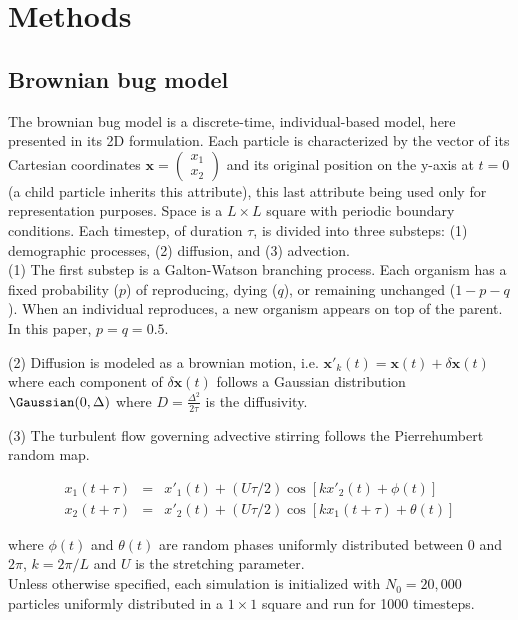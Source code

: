 \section*{Methods}

\subsection*{Brownian bug model}
The brownian bug model is a discrete-time, individual-based model, here presented in its 2D formulation. Each particle is characterized by the vector of its Cartesian coordinates $\boldsymbol{x}=\begin{pmatrix} 
      x_1\\ 
      x_2 
\end{pmatrix}$ and its original position on the y-axis at $t=0$ (a child particle inherits this attribute), this last attribute being used only for representation purposes. Space is a $L\times L$ square with periodic boundary conditions. Each timestep, of duration $\tau$, is divided into three substeps: (1) demographic processes, (2) diffusion, and (3) advection. \\

(1) The first substep is a Galton-Watson branching process. Each organism has a fixed probability ($p$) of reproducing, dying ($q$), or remaining unchanged ($1-p-q$). When an individual reproduces, a new organism appears on top of the parent. In this paper, $p=q=0.5$.

(2) Diffusion is modeled as a brownian motion, i.e. $\boldsymbol{x'}_k(t)=\boldsymbol{x}(t)+\delta\boldsymbol{x}(t)$ where each component of $\delta\boldsymbol{x}(t)$ follows a Gaussian distribution $\Gaussian (0,\Delta)$ where $D=\frac{\Delta^2}{2\tau}$ is the diffusivity. 

(3) The turbulent flow governing advective stirring follows the Pierrehumbert random map.

\begin{eqnarray}
 x_1(t+\tau)&=&x'_1(t)+(U\tau/2)\cos[kx'_2(t)+\phi(t)]\\
 x_2(t+\tau)&=&x'_2(t)+(U\tau/2)\cos[kx_1(t+\tau)+\theta(t)]
 \label{eq:pierrehumbert}
 \end{eqnarray}

 where $\phi(t)$ and $\theta(t)$ are random phases uniformly distributed between 0 and $2\pi$, $k=2\pi/L$ and $U$ is the stretching parameter. \\
 
Unless otherwise specified, each simulation is initialized with $N_0=20,000$ particles uniformly distributed in a $1\times 1$ square and run for 1000 timesteps.
 
